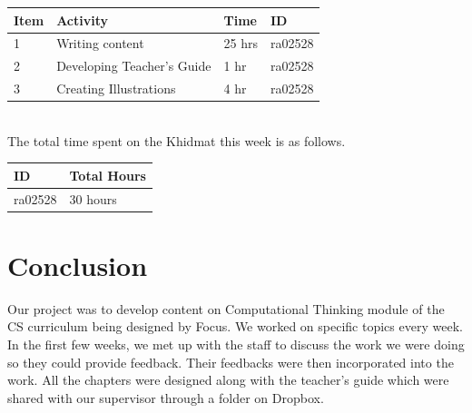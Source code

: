 \documentclass{article}
\begin{document}
\begin{tabular}{|l|l|l|l|}
  \hline
  Item 	& Activity & Time & ID \\\hline\hline
  1	& Writing content & 25 hrs & ra02528 \\\hline
  2	& Developing Teacher's Guide & 1 hr & ra02528 \\\hline
  3	& Creating Illustrations & 4 hr & ra02528 \\\hline
\end{tabular}\\

The total time spent on the Khidmat this week is as follows.

\begin{tabular}{|l|l|}
  \hline
  ID & Total Hours\\\hline\hline
  ra02528 & 30 hours\\\hline
\end{tabular}

\newpage
\section*{Conclusion}


Our project was to develop content on Computational Thinking module of the CS curriculum being designed by Focus. We worked on specific topics every week. In the first few weeks, we met up with the staff to discuss the work we were doing so they could provide feedback. Their feedbacks were then incorporated into the work. All the chapters were designed along with the teacher's guide which were shared with our supervisor through a folder on Dropbox.
\end{document}
